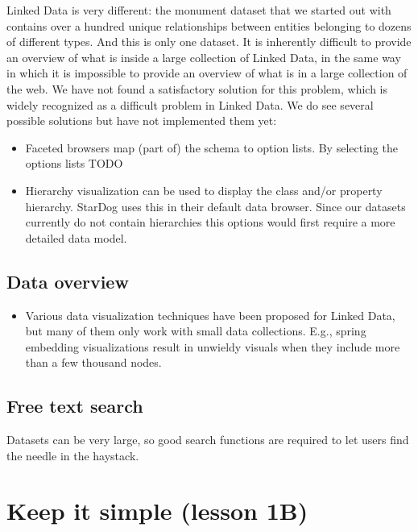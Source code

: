 \documentclass[a4paper]{scrartcl}
\begin{document}
Linked Data is very different: the monument dataset that we started
out with contains over a hundred unique relationships between entities
belonging to dozens of different types.  And this is only one dataset.
It is inherently difficult to provide an overview of what is inside a
large collection of Linked Data, in the same way in which it is
impossible to provide an overview of what is in a large collection of
the web.  We have not found a satisfactory solution for this problem,
which is widely recognized as a difficult problem in Linked Data.  We
do see several possible solutions but have not implemented them yet:

\begin{itemize}

\item Faceted browsers map (part of) the schema to option lists.  By
  selecting the options lists TODO

\item Hierarchy visualization can be used to display the class and/or
  property hierarchy.  StarDog uses this in their default data
  browser.  Since our datasets currently do not contain hierarchies
  this options would first require a more detailed data model.

\end{itemize}


\subsection{Data overview}

\begin{itemize}

\item Various data visualization techniques have been proposed for
  Linked Data, but many of them only work with small data collections.
  E.g., spring embedding visualizations result in unwieldy visuals
  when they include more than a few thousand nodes.

\end{itemize}


\subsection{Free text search}

Datasets can be very large, so good search functions are required to
let users find the needle in the haystack.


\section{Keep it simple (lesson 1B)}
\end{document}
